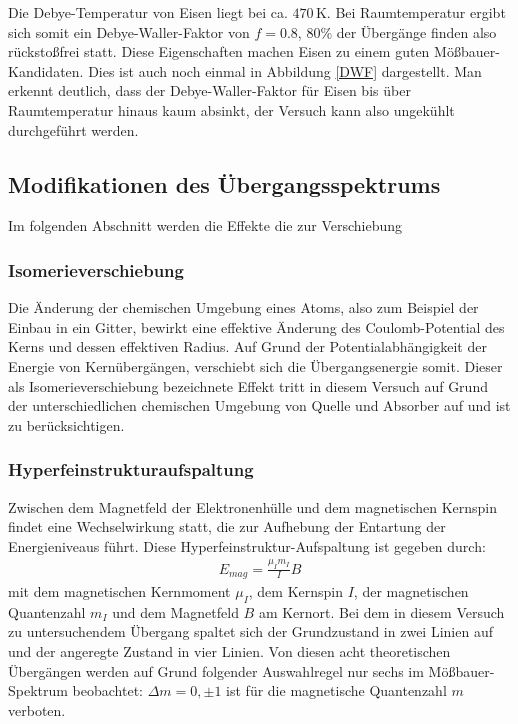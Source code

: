 Die Debye-Temperatur von Eisen liegt bei ca. $470 \,\mathrm{K}$. Bei Raumtemperatur ergibt sich somit ein Debye-Waller-Faktor von $f=0.8$, 80\% der Übergänge finden also rückstoßfrei statt. Diese Eigenschaften machen Eisen zu einem guten Mößbauer-Kandidaten. Dies ist auch noch einmal in Abbildung \ref{DWF} dargestellt. Man erkennt deutlich, dass der Debye-Waller-Faktor für Eisen bis über Raumtemperatur hinaus kaum absinkt, der Versuch kann also ungekühlt durchgeführt werden.


\subsection{Modifikationen des Übergangsspektrums}

Im folgenden Abschnitt werden die Effekte die zur Verschiebung
\subsubsection{Isomerieverschiebung \label{Isomerie}}

Die Änderung der chemischen Umgebung eines Atoms, also zum Beispiel der Einbau in ein Gitter, bewirkt eine effektive Änderung des Coulomb-Potential des Kerns und dessen effektiven Radius. Auf Grund der Potentialabhängigkeit der Energie von Kernübergängen, verschiebt sich die Übergangsenergie somit. Dieser als Isomerieverschiebung bezeichnete Effekt tritt in diesem Versuch auf Grund der unterschiedlichen chemischen Umgebung von Quelle und Absorber auf und ist zu berücksichtigen.



\subsubsection{Hyperfeinstrukturaufspaltung}

Zwischen dem Magnetfeld der Elektronenhülle und dem magnetischen Kernspin findet eine Wechselwirkung statt, die zur Aufhebung der Entartung der Energieniveaus führt. Diese Hyperfeinstruktur-Aufspaltung 
ist gegeben durch:
\begin{align}
E_{mag} = \frac{\mu_I m_I}{I}B
\end{align}
mit dem magnetischen Kernmoment $\mu_I$, dem Kernspin $I$, der magnetischen Quantenzahl $m_I$ und dem Magnetfeld $B$ am Kernort.
Bei dem in diesem Versuch zu untersuchendem Übergang spaltet sich der Grundzustand in zwei Linien auf und der angeregte Zustand in vier Linien. Von diesen acht theoretischen Übergängen werden auf Grund folgender Auswahlregel nur sechs im Mößbauer-Spektrum beobachtet: $\Delta m =0, \pm 1$ ist für die magnetische Quantenzahl $m$ verboten.

